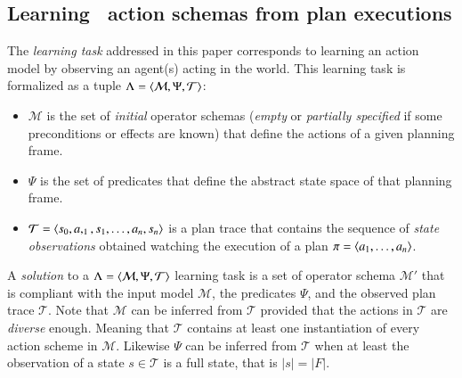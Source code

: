 \subsection{Learning \strips\ action schemas from plan executions}
The {\em learning task} addressed in this paper corresponds to learning an action model by observing an agent(s) acting in the world. This learning task is formalized as a tuple $\Lambda={\langle \mathcal{M},\Psi,\mathcal{T} \rangle}$:
\begin{itemize}
\item $\mathcal{M}$ is the set of {\em initial} operator schemas ({\em empty} or {\em partially specified} if some preconditions or effects are known) that define the actions of a given planning frame.
\item $\Psi$ is the set of predicates that define the abstract state space of that planning frame. 
\item $\mathcal{T}={\langle s_0,a,_1,s_1,\ldots,a_n,s_{n} \rangle}$ is a plan trace that contains the sequence of {\em state observations} obtained watching the execution of a plan $\pi={\langle a_1, \ldots, a_n \rangle}$. 
\end{itemize}

A {\em solution} to a $\Lambda={\langle \mathcal{M},\Psi,\mathcal{T} \rangle}$ learning task is a set of operator schema $\mathcal{M}'$ that is compliant with the input model $\mathcal{M}$, the predicates $\Psi$, and the observed plan trace $\mathcal{T}$. Note that $\mathcal{M}$ can be inferred from $\mathcal{T}$ provided that the actions in $\mathcal{T}$ are {\em diverse} enough. Meaning that $\mathcal{T}$ contains at least one instantiation of every action scheme in $\mathcal{M}$. Likewise $\Psi$ can be inferred from $\mathcal{T}$ when at least the observation of a state $s\in \mathcal{T}$ is a full state, that is $|s|=|F|$.



